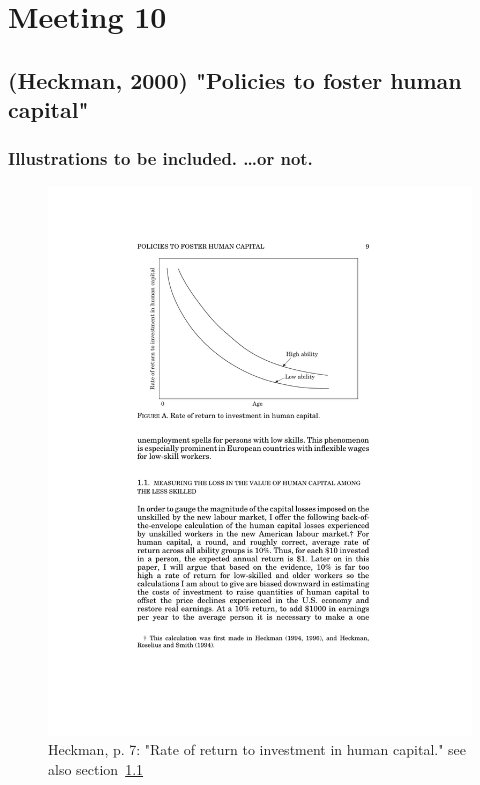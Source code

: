 \documentclass[12pt,a4paper]{article}
\begin{document}
    \section{Meeting 10} %
  \label{sec:Meeting 10}
    \subsection{(Heckman, 2000) "Policies to foster human capital"}
    \label{sec:Heckman2000}

  \subsubsection{Illustrations to be included. …or not.}
    \begin{figure}[ht]
      \centering
      \includegraphics[width=12cm]{Meeting 10 Policies to foster human capital - Seite 7.pdf}
      \caption{Heckman, p. 7: "Rate of return to investment in human capital." see also section~\ref{sec:Heckman2000}}
      \label{fig:Heckman rateofreturnhumancapital}
    \end{figure}
\end{document}
